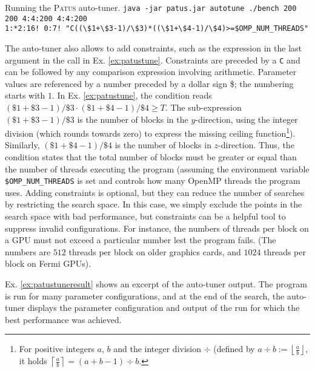 \begin{example}{Running the \textsc{Patus} auto-tuner.}
	\label{ex:patustune}
	\footnotesize
	\noindent\texttt{java -jar patus.jar autotune ./bench 200 200 4:4:200 4:4:200\\
	\phantom{XXX}1:*2:16! 0:7! "C((\textbackslash\$1+\textbackslash\$3-1)/\textbackslash\$3)*((\textbackslash\$1+\textbackslash\$4-1)/\textbackslash\$4)>=\$OMP\_NUM\_THREADS"}
\end{example}

The auto-tuner also allows to add constraints, such as the expression in the last argument in the call in Ex. \ref{ex:patustune}. Constraints are
preceded by a \texttt{C} and can be followed by any comparison expression involving arithmetic.
Parameter values are referenced by a number preceded by a dollar sign \$; the numbering starts with $1$.
In Ex. \ref{ex:patustune}, the condition reads $(\$1+\$3-1)/\$3 \cdot (\$1+\$4-1)/\$4 \geq T$.
The sub-expression $(\$1+\$3-1)/\$3$ is the number of blocks in the $y$-direction,
using the integer division (which rounds towards zero) to express the missing ceiling function\footnote{For positive
integers $a$, $b$ and the integer division $\div$ (defined by $a \div b := \left\lfloor \tfrac{a}{b} \right\rfloor$,
it holds $\left\lceil \tfrac{a}{b} \right\rceil = (a+b-1) \div b$.}). Similarly, $(\$1+\$4-1)/\$4$ is the number of blocks in $z$-direction.
Thus, the condition states that the total number of blocks must be greater or equal than the number of threads
executing the program (assuming the environment variable \texttt{\$OMP\_NUM\_THREADS} is set and controls
how many OpenMP threads the program uses.
Adding constraints is optional, but they can reduce the number of searches by restricting the search space.
In this case, we simply exclude the points in the search space with bad performance, but constraints can be
a helpful tool to suppress invalid configurations. For instance, the numbers of threads per block on a GPU 
must not exceed a particular number lest the program fails. (The numbers are $512$ threads per block on older graphics cards, and $1024$
threads per block on Fermi GPUs).

Ex. \ref{ex:patustuneresult} shows an excerpt of the auto-tuner output.
The program is run for many parameter configurations, and at the end of the search, the auto-tuner displays the parameter
configuration and output of the run for which the best performance was achieved.

